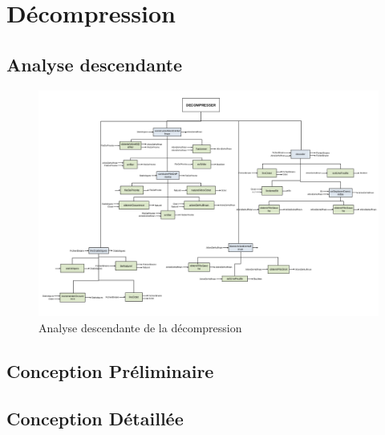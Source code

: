 \documentclass[10pt]{report}
\begin{document}
    \chapter{Décompression}

        \section{Analyse descendante}
		\begin{figure}[h]  %
   			 \centering      %
    		\includegraphics[width=1.1\textwidth]{decompresser.png}
    		\caption{Analyse descendante de la décompression}
    		\label{fig:exemple}
\end{figure}
        \newpage
        \section{Conception Préliminaire}
        	
        	
        	
        	

        \newpage
        \section{Conception Détaillée}
        	
        	
        	
        	
        	
        	
\end{document}
